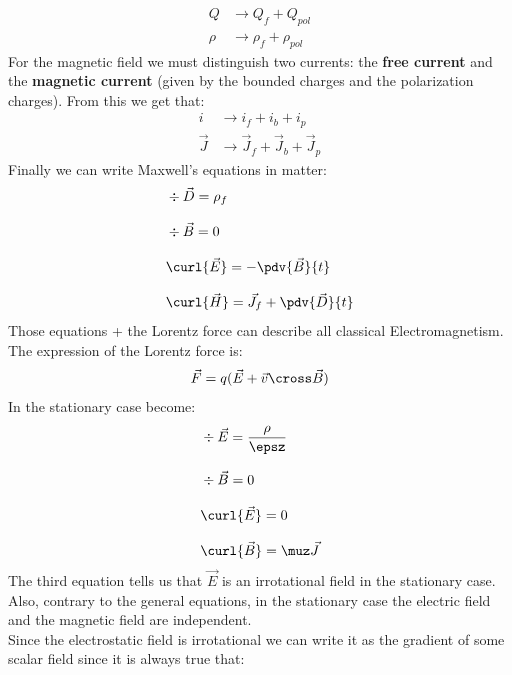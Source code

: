 \begin{equation}
  \begin{split}
    Q &\rightarrow Q_f + Q_{pol}\\[8pt]
    \rho &\rightarrow \rho_f + \rho_{pol}
  \end{split}
\end{equation}
For the magnetic field we must distinguish two currents: the \textbf{free current} and the \textbf{magnetic current} (given by the bounded charges and the polarization charges). From this we get that:
\begin{equation}
  \begin{split}
    i &\rightarrow i_f + i_b + i_p\\[8pt]
    \vec{J} &\rightarrow \vec{J}_f + \vec{J}_b + \vec{J}_p
  \end{split}
\end{equation}
Finally we can write Maxwell's equations in matter:
\begin{equation} \label{e:Maxwell_matter}
  \begin{split}
    &\div{\vec{D}} = \rho_f\\[8pt]
    &\div{\vec{B}} = 0\\[8pt]
    &\curl{\vec{E}} = -\pdv{\vec{B}}{t}\\[8pt]
    &\curl{\vec{H}} = \vec{J}_f + \pdv{\vec{D}}{t}
  \end{split}
\end{equation}
Those equations + the Lorentz force can describe all classical Electromagnetism. The expression of the Lorentz force is:
\begin{equation}
  \vec{F} = q (\vec{E} + \vec{v} \cross \vec{B})
\end{equation}
In the stationary case \maxwellref\;become:
\begin{equation} \label{e:stationary_Maxwell_eq}
  \begin{split}
    &\div{\vec{E}} = \dfrac{\rho}{\epsz}\\[8pt]
    &\div{\vec{B}} = 0\\[8pt]
    &\curl{\vec{E}} = 0\\[8pt]
    &\curl{\vec{B}} = \muz \vec{J}
  \end{split}
\end{equation}
The third equation tells us that $\vec{E}$ is an irrotational field in the stationary case. Also, contrary to the general equations, in the stationary case the electric field and the magnetic field are independent.\\
Since the electrostatic field is irrotational we can write it as the gradient of some scalar field since it is always true that:
